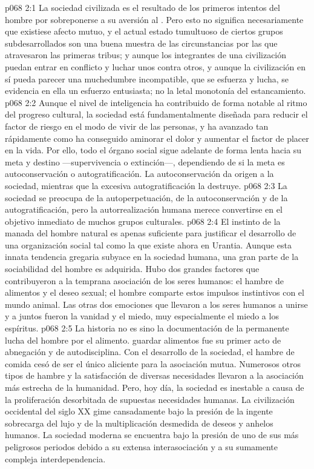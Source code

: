 \vs p068 2:1 La sociedad civilizada es el resultado de los primeros intentos del hombre por sobreponerse a su aversión al . Pero esto no significa necesariamente que existiese afecto mutuo, y el actual estado tumultuoso de ciertos grupos subdesarrollados son una buena muestra de las circunstancias por las que atravesaron las primeras tribus; y aunque los integrantes de una civilización puedan entrar en conflicto y luchar unos contra otros, y aunque la civilización en sí pueda parecer una muchedumbre incompatible, que se esfuerza y lucha, se evidencia en ella un esfuerzo entusiasta; no la letal monotonía del estancamiento.
\vs p068 2:2 Aunque el nivel de inteligencia ha contribuido de forma notable al ritmo del progreso cultural, la sociedad está fundamentalmente diseñada para reducir el factor de riesgo en el modo de vivir de las personas, y ha avanzado tan rápidamente como ha conseguido aminorar el dolor y aumentar el factor de placer en la vida. Por ello, todo el órgano social sigue adelante de forma lenta hacia su meta y destino ---supervivencia o extinción---, dependiendo de si la meta es autoconservación o autogratificación. La autoconservación da origen a la sociedad, mientras que la excesiva autogratificación la destruye.
\vs p068 2:3 La sociedad se preocupa de la autoperpetuación, de la autoconservación y de la autogratificación, pero la autorrealización humana merece convertirse en el objetivo inmediato de muchos grupos culturales.
\vs p068 2:4 El instinto de la manada del hombre natural es apenas suficiente para justificar el desarrollo de una organización social tal como la que existe ahora en Urantia. Aunque esta innata tendencia gregaria subyace en la sociedad humana, una gran parte de la sociabilidad del hombre es adquirida. Hubo dos grandes factores que contribuyeron a la temprana asociación de los seres humanos: el hambre de alimentos y el deseo sexual; el hombre comparte estos impulsos instintivos con el mundo animal. Las otras dos emociones que llevaron a los seres humanos a unirse y a  juntos fueron la vanidad y el miedo, muy especialmente el miedo a los espíritus.
\vs p068 2:5 \pc La historia no es sino la documentación de la permanente lucha del hombre por el alimento.  guardar alimentos fue su primer acto de abnegación y de autodisciplina. Con el desarrollo de la sociedad, el hambre de comida cesó de ser el único aliciente para la asociación mutua. Numerosos otros tipos de hambre y la satisfacción de diversas necesidades llevaron a la asociación más estrecha de la humanidad. Pero, hoy día, la sociedad es inestable a causa de la proliferación desorbitada de supuestas necesidades humanas. La civilización occidental del siglo XX gime cansadamente bajo la presión de la ingente sobrecarga del lujo y de la multiplicación desmedida de deseos y anhelos humanos. La sociedad moderna se encuentra bajo la presión de uno de sus más peligrosos periodos debido a su extensa interasociación y a su sumamente compleja interdependencia.

